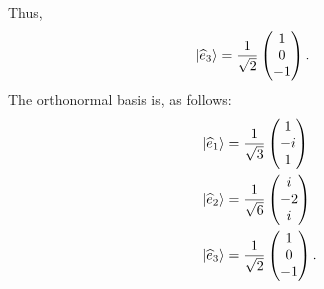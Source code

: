\documentclass[10pt]{mypackage}
\begin{document}
\begin{example}
 Thus,
 \begin{align*}
   \ket{\widehat{e}_3} &= \frac{1}{\sqrt{2}} \begin{pmatrix}1\\0\\-1\end{pmatrix}.
 \end{align*}
 The orthonormal basis is, as follows:
 \begin{align*}
   \ket{\widehat{e}_1} &= \frac{1}{\sqrt{3}} \begin{pmatrix}1\\-i\\1\end{pmatrix}\\
   \ket{\widehat{e}_2} &= \frac{1}{\sqrt{6}} \begin{pmatrix}i\\-2\\i\end{pmatrix}\\
   \ket{\widehat{e}_3} &= \frac{1}{\sqrt{2}} \begin{pmatrix}1\\0\\-1\end{pmatrix}.
 \end{align*}
\end{example}
\end{document}
